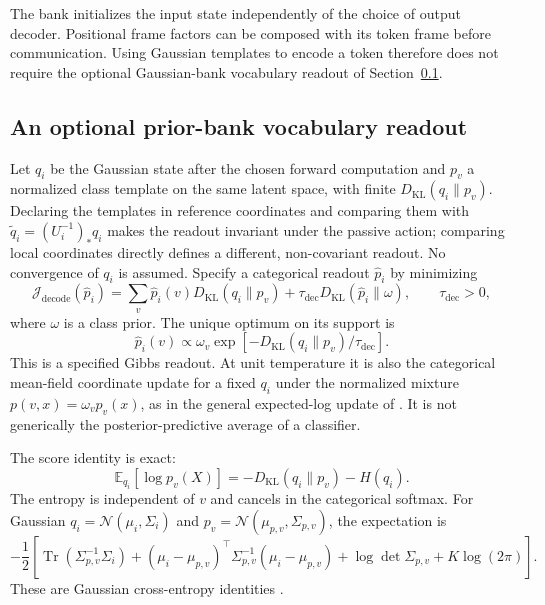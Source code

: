 \documentclass[twoside,11pt]{article}
\begin{document}
The bank initializes the input state independently of the choice of output decoder. Positional frame factors can be composed with its token frame before communication. Using Gaussian templates to encode a token therefore does not require the optional Gaussian-bank vocabulary readout of Section~\ref{sec:prior_bank_readout}.

\subsection{An optional prior-bank vocabulary readout}
\label{sec:prior_bank_readout}

Let $q_i$ be the Gaussian state after the chosen forward computation and $p_v$ a normalized class template on the same latent space, with finite $D_{\mathrm{KL}}(q_i\|p_v)$. Declaring the templates in reference coordinates and comparing them with $\widetilde q_i=(U_i^{-1})_*q_i$ makes the readout invariant under the passive action; comparing local coordinates directly defines a different, non-covariant readout. No convergence of $q_i$ is assumed. Specify a categorical readout $\hat p_i$ by minimizing
\begin{equation}
\mathcal J_{\mathrm{decode}}(\hat p_i)
=\sum_v\hat p_i(v)D_{\mathrm{KL}}(q_i\|p_v)
+\tau_{\mathrm{dec}}D_{\mathrm{KL}}(\hat p_i\|\omega),
\qquad\tau_{\mathrm{dec}}>0,
\end{equation}
where $\omega$ is a class prior. The unique optimum on its support is
\begin{equation}
\hat p_i(v)\propto\omega_v\exp\left[-D_{\mathrm{KL}}(q_i\|p_v)/\tau_{\mathrm{dec}}\right].
\label{eq:readout_gibbs}
\end{equation}
This is a specified Gibbs readout. At unit temperature it is also the categorical mean-field coordinate update for a fixed $q_i$ under the normalized mixture $p(v,x)=\omega_vp_v(x)$, as in the general expected-log update of \citet[\S2.4, Eqs.~17--18]{Blei2017}. It is not generically the posterior-predictive average of a classifier.

The score identity is exact:
\begin{equation}
\mathbb E_{q_i}[\log p_v(X)]
=-D_{\mathrm{KL}}(q_i\|p_v)-H(q_i).
\label{eq:readout_kl_decomposition}
\end{equation}
The entropy is independent of $v$ and cancels in the categorical softmax. For Gaussian $q_i=\mathcal N(\mu_i,\Sigma_i)$ and $p_v=\mathcal N(\mu_{p,v},\Sigma_{p,v})$, the expectation is
\begin{equation}
-\frac12\left[
\operatorname{Tr}(\Sigma_{p,v}^{-1}\Sigma_i)
+(\mu_i-\mu_{p,v})^\top\Sigma_{p,v}^{-1}(\mu_i-\mu_{p,v})
+\log\det\Sigma_{p,v}+K\log(2\pi)
\right].
\label{eq:readout_expected_loglik}
\end{equation}
These are Gaussian cross-entropy identities \citep{Bishop2006}.
\end{document}
